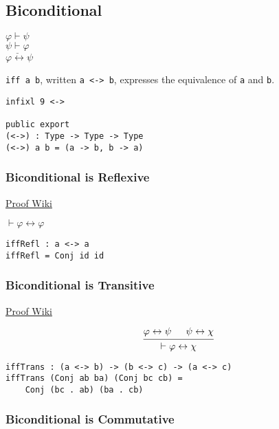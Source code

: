 \documentclass{acm_proc_article-sp}
\renewcommand{\iff}{\leftrightarrow}
\begin{document}
\subsection{Biconditional}\label{biconditional}

\(\varphi \vdash \psi\)\\
\(\underline{\psi \vdash \varphi}\)\\
\(\varphi \iff \psi\)

\texttt{iff a b}, written \texttt{a <-> b},
expresses the equivalence of \texttt{a} and
\texttt{b}.

\begin{verbatim}
infixl 9 <->

public export
(<->) : Type -> Type -> Type
(<->) a b = (a -> b, b -> a)
\end{verbatim}

\subsubsection{Biconditional is
Reflexive}\label{biconditional-is-reflexive}

\href{https://proofwiki.org/wiki/Biconditional_is_Reflexive}{Proof Wiki}

\(\vdash \varphi \iff \varphi\)

\begin{verbatim}
iffRefl : a <-> a
iffRefl = Conj id id
\end{verbatim}

\subsubsection{Biconditional is
Transitive}\label{biconditional-is-transitive}

\href{https://proofwiki.org/wiki/Biconditional_is_Transitive}{Proof Wiki}

\[
  \begin{prooftree}
    \Hypo{ \varphi \iff \psi }
    \Hypo{ \psi \iff \chi }
    \Infer2 { \vdash \varphi \iff \chi }
  \end{prooftree}
\]

\begin{verbatim}
iffTrans : (a <-> b) -> (b <-> c) -> (a <-> c)
iffTrans (Conj ab ba) (Conj bc cb) =
    Conj (bc . ab) (ba . cb)
\end{verbatim}

\subsubsection{Biconditional is
Commutative}\label{biconditional-is-commutative}
\end{document}
